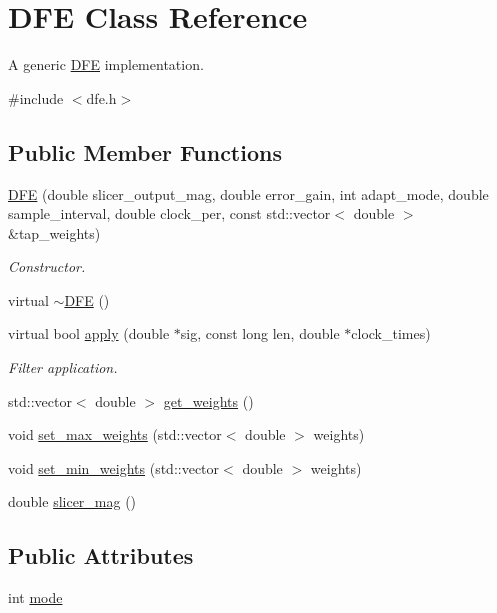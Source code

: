 \hypertarget{class_d_f_e}{}\section{D\+F\+E Class Reference}
\label{class_d_f_e}


A generic \hyperlink{class_d_f_e}{D\+F\+E} implementation.  




{\ttfamily \#include $<$dfe.\+h$>$}

\subsection*{Public Member Functions}
\begin{DoxyCompactItemize}
\item 
\hyperlink{class_d_f_e_a805ef1fae96f5e865c13948c9fb53cb3}{D\+F\+E} (double slicer\+\_\+output\+\_\+mag, double error\+\_\+gain, int adapt\+\_\+mode, double sample\+\_\+interval, double clock\+\_\+per, const std\+::vector$<$ double $>$ \&tap\+\_\+weights)
\begin{DoxyCompactList}\small\item\em Constructor. \end{DoxyCompactList}\item 
virtual \hyperlink{class_d_f_e_ae7687b2e6ae9b8a357b1a7737efacd0f}{$\sim$\+D\+F\+E} ()
\item 
virtual bool \hyperlink{class_d_f_e_a699c915b3b85b1b8c7f6c4dde2276f3b}{apply} (double $\ast$sig, const long len, double $\ast$clock\+\_\+times)
\begin{DoxyCompactList}\small\item\em Filter application. \end{DoxyCompactList}\item 
std\+::vector$<$ double $>$ \hyperlink{class_d_f_e_a07107eb59a0da47d0f18f9b8d27e8063}{get\+\_\+weights} ()
\item 
void \hyperlink{class_d_f_e_acc351ad844da9fc180f27f71eae0dcb7}{set\+\_\+max\+\_\+weights} (std\+::vector$<$ double $>$ weights)
\item 
void \hyperlink{class_d_f_e_af44c7fec6b03d7786ca0dc2006bd2f08}{set\+\_\+min\+\_\+weights} (std\+::vector$<$ double $>$ weights)
\item 
double \hyperlink{class_d_f_e_a39837607d789fc9b65b7fadfab441f1f}{slicer\+\_\+mag} ()
\end{DoxyCompactItemize}
\subsection*{Public Attributes}
\begin{DoxyCompactItemize}
\item 
int \hyperlink{class_d_f_e_a0202ee4a4e6bc6ad385e7885383691c6}{mode}
\end{DoxyCompactItemize}
